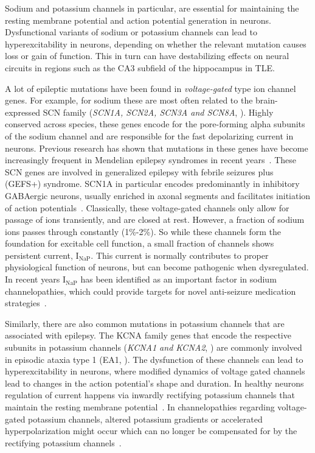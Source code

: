 Sodium and potassium channels in particular, are essential for maintaining the resting
membrane potential and action potential generation in neurons.
Dysfunctional variants of sodium or potassium channels can lead to hyperexcitability in neurons, depending on whether the relevant mutation causes loss or gain of function.
This in turn can have destabilizing effects on neural circuits in regions such as the CA3 subfield of the hippocampus in TLE\@.

A lot of epileptic mutations have been found in \textit{voltage-gated} type ion channel genes.
For example, for sodium these are most often related to the brain-expressed SCN family (\textit{SCN1A, SCN2A, SCN3A and SCN8A}, \textcite{brunklausSodiumChannelEpilepsies2020}).
Highly conserved across species, these genes encode for the pore-forming alpha subunits of the sodium channel and are responsible for the fast depolarizing current in neurons.
Previous research has shown that mutations in these genes have become increasingly frequent in Mendelian epilepsy syndromes in recent years~\parencite{brunklausSodiumChannelEpilepsies2020}.
These SCN genes are involved in generalized epilepsy with febrile seizures plus (GEFS+) syndrome.
SCN1A in particular encodes predominantly in inhibitory GABAergic neurons, usually enriched in axonal segments and facilitates initiation of action potentials~\parencite{yuReducedSodiumCurrent2006}.
Classically, these voltage-gated channels only allow for passage of ions transiently, and are closed at rest.
However, a fraction of sodium ions passes through constantly (1\%-2\%).
So while these channels form the foundation for excitable cell function, a small fraction of channels shows persistent current, \(\text{I}_{\text{NaP}}\).
This current is normally contributes to proper physiological function of neurons, but can become pathogenic when dysregulated.
In recent years \(\text{I}_{\text{NaP}}\) has been identified as an important factor in sodium channelopathies, which could provide targets for novel anti-seizure medication strategies~\parencite{wengertRolePersistentSodium2021}.

Similarly, there are also common mutations in potassium channels that are associated with epilepsy.
The KCNA family genes that encode the respective subunits in potassium channels (\textit{KCNA1 and KCNA2}, \textcite{gaoPotassiumChannelsEpilepsy2022})
are commonly involved in episodic ataxia type 1 (EA1, \textcite{gravesIonChannelsEpilepsy2006}).
The dysfunction of these channels can lead to hyperexcitability in neurons, where modified dynamics of voltage gated channels lead to changes in the action potential's shape and duration.
In healthy neurons regulation of current happens via inwardly rectifying potassium channels that maintain the resting membrane potential~\parencite{isomotoInwardlyRectifyingPotassium1997}.
In channelopathies regarding voltage-gated potassium channels, altered potassium gradients or accelerated hyperpolarization might occur which can no longer be compensated for by the rectifying
potassium channels~\parencite{nikitinPotassiumChannelsProminent2021}.

